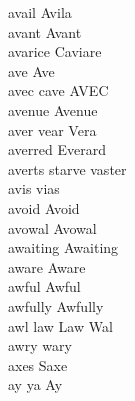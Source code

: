 avail Avila\\
avant Avant\\
avarice Caviare\\
ave Ave\\
avec cave AVEC\\
avenue Avenue\\
aver vear Vera\\
averred Everard\\
averts starve vaster\\
avis vias\\
avoid Avoid\\
avowal Avowal\\
awaiting Awaiting\\
aware Aware\\
awful Awful\\
awfully Awfully\\
awl law Law Wal\\
awry wary\\
axes Saxe\\
ay ya Ay\\

